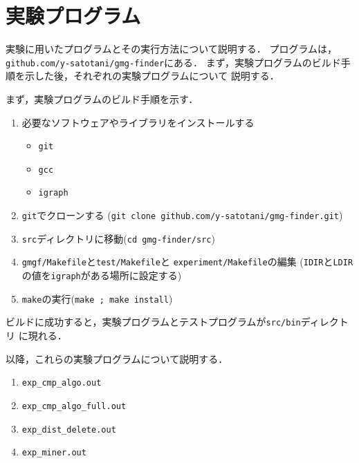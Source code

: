 
\chapter{実験プログラム}
\label{chap:experimental-program}
実験に用いたプログラムとその実行方法について説明する．
プログラムは，\verb|github.com/y-satotani/gmg-finder|にある．
まず，実験プログラムのビルド手順を示した後，それぞれの実験プログラムについて
説明する．

まず，実験プログラムのビルド手順を示す．
\begin{enumerate}
\item 必要なソフトウェアやライブラリをインストールする
  \begin{itemize}
  \item \verb|git|
  \item \verb|gcc|
  \item \verb|igraph|
  \end{itemize}
\item \verb|git|でクローンする
  (\verb|git clone github.com/y-satotani/gmg-finder.git|)
\item \verb|src|ディレクトリに移動(\verb|cd gmg-finder/src|)
\item \verb|gmgf/Makefile|と\verb|test/Makefile|と
  \verb|experiment/Makefile|の編集
  (\verb|IDIR|と\verb|LDIR|の値を\verb|igraph|がある場所に設定する)
\item \verb|make|の実行(\verb|make ; make install|)
\end{enumerate}
ビルドに成功すると，実験プログラムとテストプログラムが\verb|src/bin|ディレクトリ
に現れる．

以降，これらの実験プログラムについて説明する．
\begin{enumerate}
\item \texttt{exp\_cmp\_algo.out}
\item \texttt{exp\_cmp\_algo\_full.out}
\item \texttt{exp\_dist\_delete.out}
\item \texttt{exp\_miner.out}
\end{enumerate}

